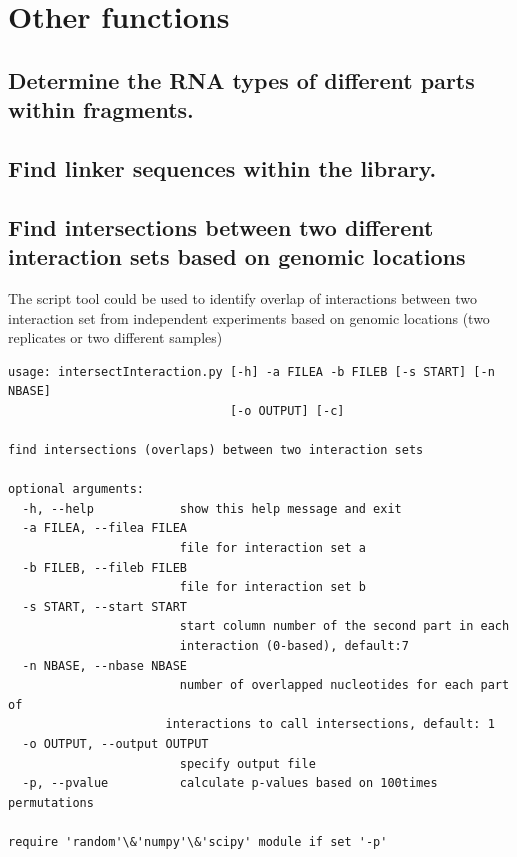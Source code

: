 \documentclass[letterpaper,10pt,english]{sphinxmanual}
\begin{document}
\section{Other functions}
\label{Analysis_pipeline:other-functions}

\subsection{Determine the RNA types of different parts within fragments.}
\label{Analysis_pipeline:rna-types}\label{Analysis_pipeline:determine-the-rna-types-of-different-parts-within-fragments}

\subsection{Find linker sequences within the library.}
\label{Analysis_pipeline:find-linker-sequences-within-the-library}\label{Analysis_pipeline:find-linker}

\subsection{Find intersections between two different interaction sets based on genomic locations}
\label{Analysis_pipeline:find-intersections-between-two-different-interaction-sets-based-on-genomic-locations}\label{Analysis_pipeline:intersection}
The script tool  could be used to identify overlap of interactions between two interaction set from independent experiments based on genomic locations (two replicates or two different samples)

\begin{Verbatim}[commandchars=\\\{\}]
usage: intersectInteraction.py [-h] -a FILEA -b FILEB [-s START] [-n NBASE]
                               [-o OUTPUT] [-c]

find intersections (overlaps) between two interaction sets

optional arguments:
  -h, --help            show this help message and exit
  -a FILEA, --filea FILEA
                        file for interaction set a
  -b FILEB, --fileb FILEB
                        file for interaction set b
  -s START, --start START
                        start column number of the second part in each
                        interaction (0-based), default:7
  -n NBASE, --nbase NBASE
                        number of overlapped nucleotides for each part of
                      interactions to call intersections, default: 1
  -o OUTPUT, --output OUTPUT
                        specify output file
  -p, --pvalue          calculate p-values based on 100times permutations

require 'random'\&'numpy'\&'scipy' module if set '-p'
\end{Verbatim}
\end{document}
